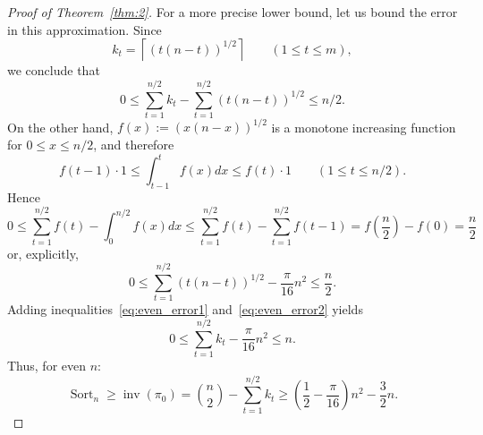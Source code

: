 \documentclass[11pt]{amsart}
\numberwithin{equation}{section}
\newcommand{\todo}[1]{\vspace{5 mm}\par \noindent
\marginpar{\textsc{ToDo}} \framebox{\begin{minipage}[c]{0.95
\textwidth}
 #1 \end{minipage}}\vspace{5 mm}\par}
\newcommand{\inv}{{\operatorname{inv}}}
\newcommand{\Sort}{{\operatorname{Sort}}}
\begin{document}
\begin{proof}[Proof of Theorem~\ref{thm:2}]
For a more precise lower bound, let us bound the error in this approximation. Since
\[
    k_t 
    = \left\lceil (t(n-t))^{1/2} \right\rceil
    \qquad (1 \le t \le m),
\]
we conclude that
\begin{equation}\label{eq:even_error1}
    0 
    \le \sum_{t=1}^{n/2} k_t - \sum_{t=1}^{n/2} (t(n-t))^{1/2}
    \le n/2.    
\end{equation}
On the other hand, $f(x) := \left(x(n-x)\right)^{1/2}$ is a monotone increasing function for $0\le x\le n/2$, and therefore 
\[
    f(t-1) \cdot 1 
    \le \int_{t-1}^{t} f(x)dx
    \le f(t)\cdot 1
    \qquad (1 \le t \le n/2).
\]
Hence 
\[
    0
    \le \sum_{t=1}^{n/2} f(t) - \int_0^{n/2} f(x)dx
    \le \sum_{t=1}^{n/2} f(t) - \sum_{t=1}^{n/2} f(t-1)
    = f \left( \frac{n}{2} \right)-f(0)
    = \frac{n}{2}
\]
or, explicitly,
\begin{equation}\label{eq:even_error2}
    0 
    \le \sum_{t=1}^{n/2} (t(n-t))^{1/2} - \frac{\pi}{16} n^2
    \le \frac{n}{2}.    
\end{equation}
Adding inequalities~\eqref{eq:even_error1} and~\eqref{eq:even_error2} yields
\[
    0 
    \le \sum_{t=1}^{n/2} k_t  - \frac{\pi}{16} n^2
    \le n.    
\]
Thus, for even $n$:
\[
    \Sort_n\ge \inv(\pi_0) 
    = \binom{n}{2} - \sum_{t=1}^{n/2} k_t  
    \ge \left( \frac{1}{2} - \frac{\pi}{16} \right) n^2 - \frac{3}{2} n.
\]

\medskip


\end{proof}
\end{document}
